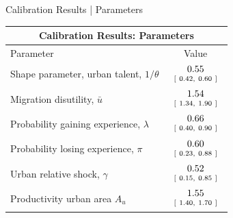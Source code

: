 \documentclass[9pt,pdftex,aspectratio=1610]{beamer}
\theoremstyle{definition}
\begin{document}
\begin{frame}[t]{Calibration Results | Parameters }
\small
\begin{table}[!t]
\footnotesize
{}
\label{ta:cal}
\setlength {\tabcolsep}{4.5mm}
\renewcommand{\arraystretch}{1.10}
\begin{center}
\begin{tabular}{l c }
\multicolumn{2}{c}{\textbf{\small Calibration Results: Parameters}}\\
\hline
\hline
Parameter & Value \\
\hline
Shape parameter, urban talent, $1/\theta$   & $\begin{array}{c}0.55\vspace{-.1cm} \\ \scriptstyle [ \ 0.42, \ 0.60 \ ] \end{array}$ \\
Migration disutility, $\bar u$              & $\begin{array}{c}1.54 \vspace{-.1cm}\\ \scriptstyle [\ 1.34, \  1.90 \ ] \end{array}$ \\
Probability gaining experience, $\lambda$   & $\begin{array}{c}0.66\vspace{-.1cm}\\ \scriptstyle [ \ 0.40, \ 0.90 \ ]  \end{array}$ \\
Probability losing experience, $\pi$        & $\begin{array}{c}0.60 \vspace{-.1cm}\\ \scriptstyle [ \ 0.23, \ 0.88 \ ] \end{array}$  \\
Urban relative shock, $\gamma$              & $\begin{array}{c}0.52\vspace{-.1cm}\\ \scriptstyle [ \ 0.15, \ 0.85\  ]  \end{array}$ \\
Productivity urban area $A_u$               & $\begin{array}{c}1.55\vspace{-.1cm}\\ \scriptstyle [ \ 1.40, \ 1.70\  ]  \end{array}$ \\

\end{tabular}
\end{center}
\end{table}
\end{frame}
\end{document}

